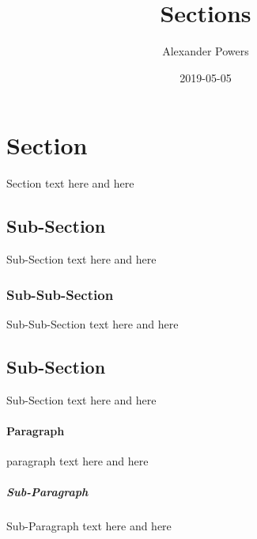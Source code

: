 \documentclass{article}
\title{Sections}
\date{2019-05-05}
\author{Alexander Powers}
\begin{document}
\maketitle
{}

\section{Section}
Section text here
and here

\subsection{Sub-Section}
Sub-Section text here
and here

\subsubsection{Sub-Sub-Section}
Sub-Sub-Section text here
and here

\subsection{Sub-Section}
Sub-Section text here
and here

\paragraph{Paragraph}
paragraph text here
and here

\subparagraph{Sub-Paragraph}
Sub-Paragraph text here
and here
\end{document}

